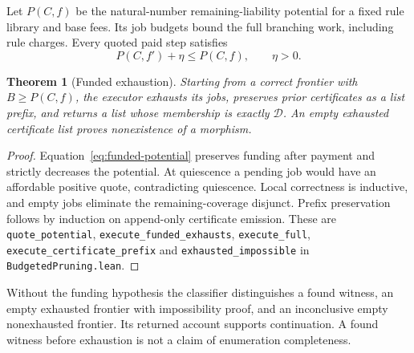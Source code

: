 \documentclass[10pt,letterpaper]{article}
\newtheorem{theorem}{Theorem}[section]
\newcommand{\CanonRef}{\mathcal D}
\newcommand{\rc}[1]{\texttt{#1}}
\begin{document}
Let $P(C,f)$ be the natural-number remaining-liability potential for a fixed rule library and base fees. Its job budgets bound the full branching work, including rule charges. Every quoted paid step satisfies
\begin{equation}\label{eq:funded-potential}
 P(C,f')+\eta\le P(C,f),\qquad\eta>0.
\end{equation}
\begin{theorem}[Funded exhaustion]\label{thm:funded-search}
Starting from a correct frontier with $B\ge P(C,f)$, the executor exhausts its jobs, preserves prior certificates as a list prefix, and returns a list whose membership is exactly $\CanonRef$. An empty exhausted certificate list proves nonexistence of a morphism.
\end{theorem}
\begin{proof}
Equation~\eqref{eq:funded-potential} preserves funding after payment and strictly decreases the potential. At quiescence a pending job would have an affordable positive quote, contradicting quiescence. Local correctness is inductive, and empty jobs eliminate the remaining-coverage disjunct. Prefix preservation follows by induction on append-only certificate emission. These are \rc{quote\_potential}, \rc{execute\_funded\_exhausts}, \rc{execute\_full}, \rc{execute\_certificate\_prefix} and \rc{exhausted\_impossible} in \rc{BudgetedPruning.lean}.
\end{proof}
Without the funding hypothesis the classifier distinguishes a found witness, an empty exhausted frontier with impossibility proof, and an inconclusive empty nonexhausted frontier. Its returned account supports continuation. A found witness before exhaustion is not a claim of enumeration completeness.
\end{document}
